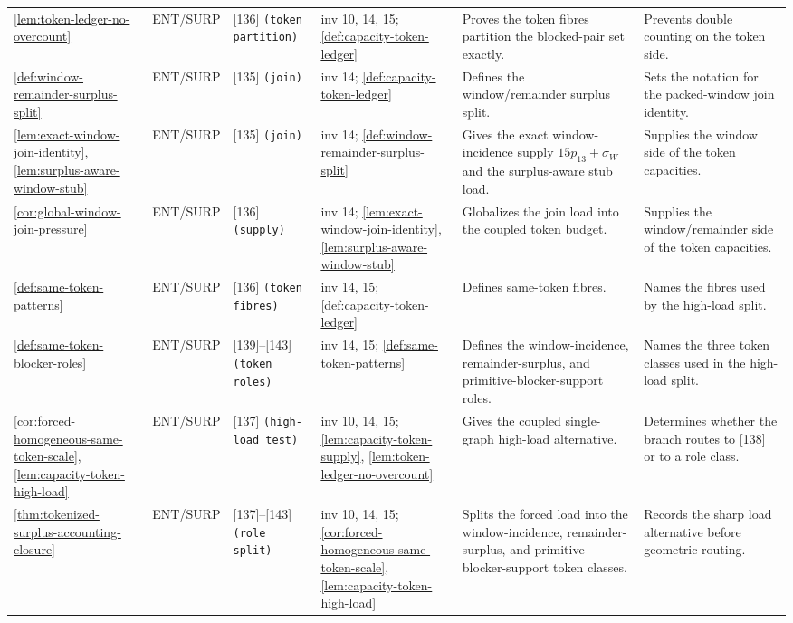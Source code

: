\documentclass[11pt]{article}
\begin{document}
{\begin{longtable}{L{0.10\textwidth} C{0.045\textwidth} L{0.13\textwidth} L{0.135\textwidth} L{0.28\textwidth} L{0.20\textwidth}}
\cref{lem:token-ledger-no-overcount} & ENT\slash SURP & [136] \texttt{(token partition)} & inv 10, 14, 15; \cref{def:capacity-token-ledger} & Proves the token fibres partition the blocked-pair set exactly. & Prevents double counting on the token side. \\
\cref{def:window-remainder-surplus-split} & ENT\slash SURP & [135] \texttt{(join)} & inv 14; \cref{def:capacity-token-ledger} & Defines the window/remainder surplus split. & Sets the notation for the packed-window join identity. \\
\cref{lem:exact-window-join-identity}, \cref{lem:surplus-aware-window-stub} & ENT\slash SURP & [135] \texttt{(join)} & inv 14; \cref{def:window-remainder-surplus-split} & Gives the exact window-incidence supply \(15p_{13}+\sigma_W\) and the surplus-aware stub load. & Supplies the window side of the token capacities. \\
\cref{cor:global-window-join-pressure} & ENT\slash SURP & [136] \texttt{(supply)} & inv 14; \cref{lem:exact-window-join-identity}, \cref{lem:surplus-aware-window-stub} & Globalizes the join load into the coupled token budget. & Supplies the window/remainder side of the token capacities. \\
\cref{def:same-token-patterns} & ENT\slash SURP & [136] \texttt{(token fibres)} & inv 14, 15; \cref{def:capacity-token-ledger} & Defines same-token fibres. & Names the fibres used by the high-load split. \\
\cref{def:same-token-blocker-roles} & ENT\slash SURP & [139]--[143] \texttt{(token roles)} & inv 14, 15; \cref{def:same-token-patterns} & Defines the window-incidence, remainder-surplus, and primitive-blocker-support roles. & Names the three token classes used in the high-load split. \\
\cref{cor:forced-homogeneous-same-token-scale}, \cref{lem:capacity-token-high-load} & ENT\slash SURP & [137] \texttt{(high-load test)} & inv 10, 14, 15; \cref{lem:capacity-token-supply}, \cref{lem:token-ledger-no-overcount} & Gives the coupled single-graph high-load alternative. & Determines whether the branch routes to [138] or to a role class. \\
\cref{thm:tokenized-surplus-accounting-closure} & ENT\slash SURP & [137]--[143] \texttt{(role split)} & inv 10, 14, 15; \cref{cor:forced-homogeneous-same-token-scale}, \cref{lem:capacity-token-high-load} & Splits the forced load into the window-incidence, remainder-surplus, and primitive-blocker-support token classes. & Records the sharp load alternative before geometric routing. \\

\end{longtable}}
\end{document}
